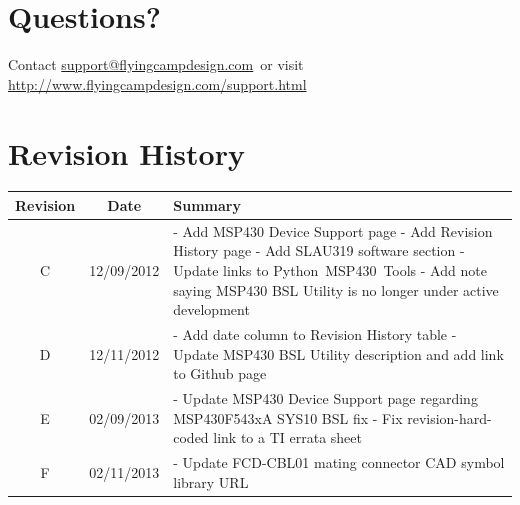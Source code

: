 \documentclass[10pt,letterpaper]{datasheet}
\makeatletter
\newcommand{\fcdsupportemail}{\href{mailto:support@flyingcampdesign.com}{support@flyingcampdesign.com}}
\newcommand{\fcdsupporturl}{\href{http://www.flyingcampdesign.com/support.html}{http://www.flyingcampdesign.com/support.html}}
\newcommand{\pmt}{Python~MSP430~Tools}
\makeatother
\begin{document}
\newpage

\section*{Questions?}
Contact \fcdsupportemail\ or visit \fcdsupporturl

\newpage

\section*{Revision History}
\label{tab:revision-history}
\begin{tabularx}{\textwidth}{|c|c|X|}
  \hline
  Revision &
  Date &
  Summary \\
  \hline
  C & 12/09/2012 & - Add MSP430 Device Support page \newline %
                   - Add Revision History page \newline %
                   - Add SLAU319 software section \newline %
                   - Update links to \pmt \newline %
                   - Add note saying MSP430 BSL Utility is no longer under active development \\
  \hline
  D & 12/11/2012 & - Add date column to Revision History table \newline %
                   - Update MSP430 BSL Utility description and add link to Github page \\
  \hline
  E & 02/09/2013 & - Update MSP430 Device Support page regarding MSP430F543xA SYS10 BSL fix  \newline %
                   - Fix revision-hard-coded link to a TI errata sheet \\
  \hline
  F & 02/11/2013 & - Update FCD-CBL01 mating connector CAD symbol library URL \\
  \hline
\end{tabularx}

\newpage


\end{document}
